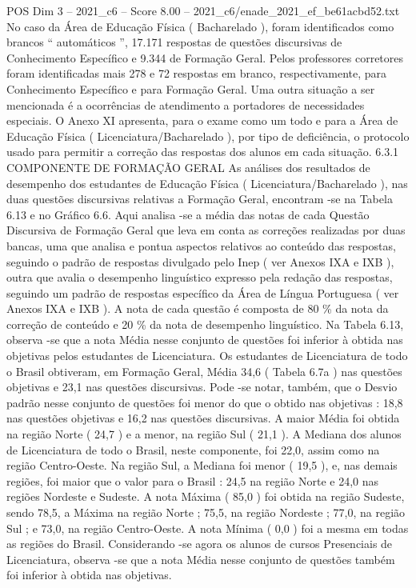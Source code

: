 \begin{textsample}{POS Dim 3 – 2021\_c6 – Score 8.00 – 2021\_c6/enade\_2021\_ef\_be61acbd52.txt}
No caso da Área de Educação Física ( Bacharelado ), foram identificados como brancos “ automáticos ”, 17.171 respostas de questões discursivas de Conhecimento Específico e 9.344 de Formação Geral.
Pelos professores corretores foram identificadas mais 278 e 72 respostas em branco, respectivamente, para Conhecimento Específico e para Formação Geral.
Uma outra situação a ser mencionada é a ocorrências de atendimento a portadores de necessidades especiais.
O Anexo XI apresenta, para o exame como um todo e para a Área de Educação Física ( Licenciatura/Bacharelado ), por tipo de deficiência, o protocolo usado para permitir a correção das respostas dos alunos em cada situação. 6.3.1 COMPONENTE DE FORMAÇÃO GERAL As análises dos resultados de desempenho dos estudantes de Educação Física ( Licenciatura/Bacharelado ), nas duas questões discursivas relativas a Formação Geral, encontram -se na Tabela 6.13 e no Gráfico 6.6.
Aqui analisa -se a média das notas de cada Questão Discursiva de Formação Geral que leva em conta as correções realizadas por duas bancas, uma que analisa e pontua aspectos relativos ao conteúdo das respostas, seguindo o padrão de respostas divulgado pelo Inep ( ver Anexos IXA e IXB ), outra que avalia o desempenho linguístico expresso pela redação das respostas, seguindo um padrão de respostas específico da Área de Língua Portuguesa ( ver Anexos IXA e IXB ).
A nota de cada questão é composta de 80 \% da nota da correção de conteúdo e 20 \% da nota de desempenho linguístico.
Na Tabela 6.13, observa -se que a nota Média nesse conjunto de questões foi inferior à obtida nas objetivas pelos estudantes de Licenciatura.
Os estudantes de Licenciatura de todo o Brasil obtiveram, em Formação Geral, Média 34,6 ( Tabela 6.7a ) nas questões objetivas e 23,1 nas questões discursivas.
Pode -se notar, também, que o Desvio padrão nesse conjunto de questões foi menor do que o obtido nas objetivas : 18,8 nas questões objetivas e 16,2 nas questões discursivas.
A maior Média foi obtida na região Norte ( 24,7 ) e a menor, na região Sul ( 21,1 ).
A Mediana dos alunos de Licenciatura de todo o Brasil, neste componente, foi 22,0, assim como na região Centro-Oeste.
Na região Sul, a Mediana foi menor ( 19,5 ), e, nas demais regiões, foi maior que o valor para o Brasil : 24,5 na região Norte e 24,0 nas regiões Nordeste e Sudeste.
A nota Máxima ( 85,0 ) foi obtida na região Sudeste, sendo 78,5, a Máxima na região Norte ; 75,5, na região Nordeste ; 77,0, na região Sul ; e 73,0, na região Centro-Oeste.
A nota Mínima ( 0,0 ) foi a mesma em todas as regiões do Brasil.
Considerando -se agora os alunos de cursos Presenciais de Licenciatura, observa -se que a nota Média nesse conjunto de questões também foi inferior à obtida nas objetivas.

\end{textsample}

